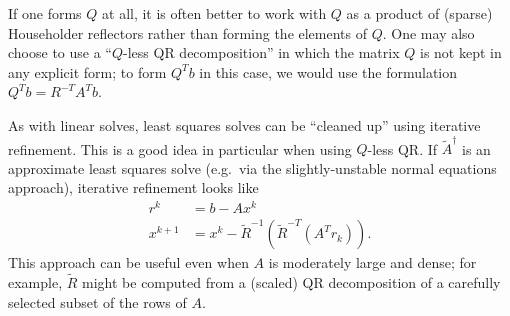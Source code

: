 \documentclass[12pt, leqno]{article} %
\begin{document}
If one forms $Q$ at all, it is often better to work with $Q$ as a
product of (sparse) Householder reflectors rather than forming the
elements of $Q$.  One may also choose to use a ``$Q$-less QR decomposition''
in which the matrix $Q$ is not kept in any explicit form; to form $Q^T b$
in this case, we would use the formulation $Q^T b = R^{-T} A^T b$.

As with linear solves, least squares solves can be ``cleaned up''
using iterative refinement.  This is a good idea in particular when
using $Q$-less QR.  If $\tilde{A}^\dagger$ is an approximate least
squares solve (e.g.~via the slightly-unstable normal equations approach),
iterative refinement looks like
\begin{align*}
  r^{k} &= b-Ax^{k} \\
  x^{k+1} &= x^k - \tilde{R}^{-1} (\tilde{R}^{-T} (A^T r_k)).
\end{align*}
This approach can be useful even when $A$ is moderately large and dense;
for example, $\tilde{R}$ might be computed from a (scaled) QR
decomposition of a carefully selected subset of the rows of $A$.
\end{document}
